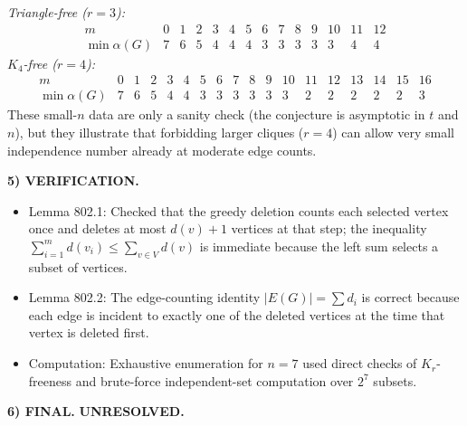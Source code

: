 \emph{Triangle-free ($r=3$):}
\[
\begin{array}{c|ccccccccccccc}
 m &0&1&2&3&4&5&6&7&8&9&10&11&12\\\hline
 \min\alpha(G) &7&6&5&4&4&4&3&3&3&3&3&4&4
\end{array}
\]
\emph{$K_4$-free ($r=4$):}
\[
\begin{array}{c|ccccccccccccccccc}
 m &0&1&2&3&4&5&6&7&8&9&10&11&12&13&14&15&16\\\hline
 \min\alpha(G) &7&6&5&4&4&3&3&3&3&3&3&2&2&2&2&2&3
\end{array}
\]
These small-$n$ data are only a sanity check (the conjecture is asymptotic in $t$ and $n$), but they illustrate that forbidding larger cliques ($r=4$) can allow very small independence number already at moderate edge counts.

\medskip
\noindent\textbf{5) VERIFICATION.}

\begin{itemize}
\item Lemma 802.1: Checked that the greedy deletion counts each selected vertex once and deletes at most $d(v)+1$ vertices at that step; the inequality $\sum_{i=1}^m d(v_i)\le \sum_{v\in V} d(v)$ is immediate because the left sum selects a subset of vertices.
\item Lemma 802.2: The edge-counting identity $|E(G)|=\sum d_i$ is correct because each edge is incident to exactly one of the deleted vertices at the time that vertex is deleted first.
\item Computation: Exhaustive enumeration for $n=7$ used direct checks of $K_r$-freeness and brute-force independent-set computation over $2^7$ subsets.
\end{itemize}

\medskip
\noindent\textbf{6) FINAL.} \textbf{UNRESOLVED.}

